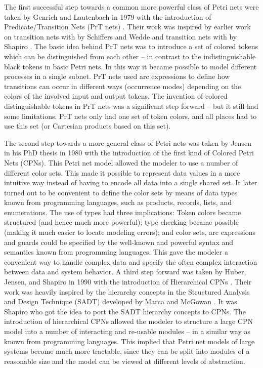 The first successful step towards a common more powerful class of
Petri nets were taken by Genrich and Lautenbach in 1979 with the
introduction of Predicate/Transition Nets (PrT nets)
\cite{genrich:81}. Their work was inspired by earlier work on
transition nets with  by Schiffers and Wedde
\cite{schiffers:78} and transition nets with  by Shapiro \cite{shapiro:78}. The basic idea behind PrT
nets was to introduce a set of colored tokens which can be
distinguished from each other -- in contrast to the indistinguishable
black tokens in basic Petri nets. In this way it became possible to
model different processes in a single subnet. PrT nets used arc
expressions to define how transitions can occur in different ways
(occurrence modes) depending on the colors of the involved input and
output tokens. The invention of colored distinguishable tokens in PrT
nets was a significant step forward -- but it still had some
limitations. PrT nets only had one set of token colors, and all places
had to use this set (or Cartesian products based on this set).

The second step towards a more general class of Petri nets was taken
by Jensen in his PhD thesis in 1980 \cite{jensen:81} with the
introduction of the first kind of Colored Petri Nets (CPNs). This
Petri net model allowed the modeler to use a number of different color
sets. This made it possible to represent data values in a more
intuitive way instead of having to encode all data into a single
shared set. It later turned out to be convenient to define the color
sets by means of data types known from programming languages, such as
products, records, lists, and enumerations. The use of types had three
implications: Token colors became structured (and hence much more
powerful); type checking became possible (making it much easier to
locate modeling errors); and color sets, arc expressions and guards
could be specified by the well-known and powerful syntax and semantics
known from programming languages. This gave the modeler a convenient
way to handle complex data and specify the often complex interaction
between data and system behavior. A third step forward was taken by
Huber, Jensen, and Shapiro in 1990 with the introduction of
Hierarchical CPNs \cite{huber:91}. Their work was heavily inspired by
the hierarchy concepts in the Structured Analysis and Design Technique
(SADT) developed by Marca and McGowan \cite{sadt}. It was Shapiro who got
the idea to port the SADT hierarchy concepts to CPNs.  The introduction
of hierarchical CPNs allowed the modeler to structure a large CPN
model into a number of interacting and re-usable modules -- in a
similar way as known from programming languages. This implied that
Petri net models of large systems become much more tractable, since
they can be split into modules of a reasonable size and the model can
be viewed at different levels of abstraction.


